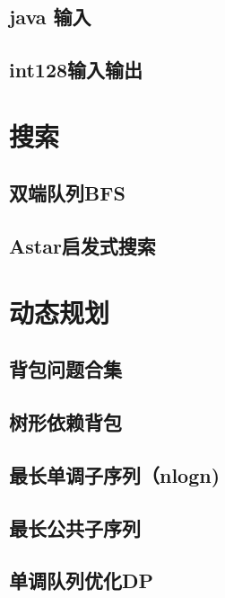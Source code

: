 \section{java 输入}
\raggedbottom
\hrulefill
\section{int128输入输出}
\raggedbottom
\hrulefill

\chapter{搜索}
\section{双端队列BFS}
\raggedbottom
\hrulefill
\section{Astar启发式搜索}
\raggedbottom
\hrulefill

\chapter{动态规划}
\section{背包问题合集}
\raggedbottom
\hrulefill
\section{树形依赖背包}
\raggedbottom
\hrulefill
\section{最长单调子序列（nlogn)}
\raggedbottom
\hrulefill
\section{最长公共子序列}
\raggedbottom
\hrulefill
\section{单调队列优化DP}
\raggedbottom
\hrulefill
